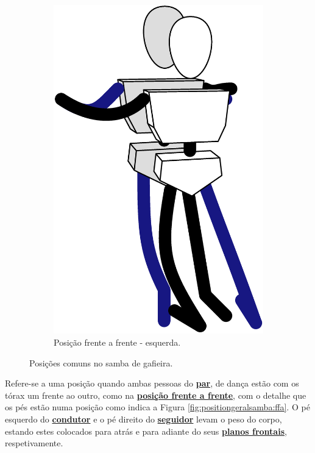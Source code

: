 \begin{figure}[!ht]
     \hfill
     \begin{subfigure}[b]{0.285\textwidth}
         \centering
         \includegraphics[width=\textwidth]{chapters/cap-normas/position-ffe.eps}
         \caption{Posição frente a frente - esquerda.}
         \label{fig:positiongeralsamba:ffe}
     \end{subfigure}
\caption{Posições comuns no samba de gafieira.}
\label{fig:positiongeralsamba:2}
\end{figure}



\begin{definition}
\label{def:ffa-position}  
Refere-se a uma posição quando ambas pessoas do \hyperref[def:Par]{\textbf{par}}, 
de dança estão com os tórax um frente ao outro, 
como na \hyperref[def:frente-frente-position]{\textbf{posição frente a frente}},
com o detalhe que os pés estão numa posição como indica a Figura \ref{fig:positiongeralsamba:ffa}.
O pé esquerdo do \hyperref[def:Condutor]{\textbf{condutor}} e 
o pé direito do \hyperref[def:Seguidor]{\textbf{seguidor}} levam o peso do corpo,
estando estes colocados para atrás e para adiante do seus \hyperref[def:PlanoFrontal]{\textbf{planos frontais}}, 
respetivamente.
\end{definition}


